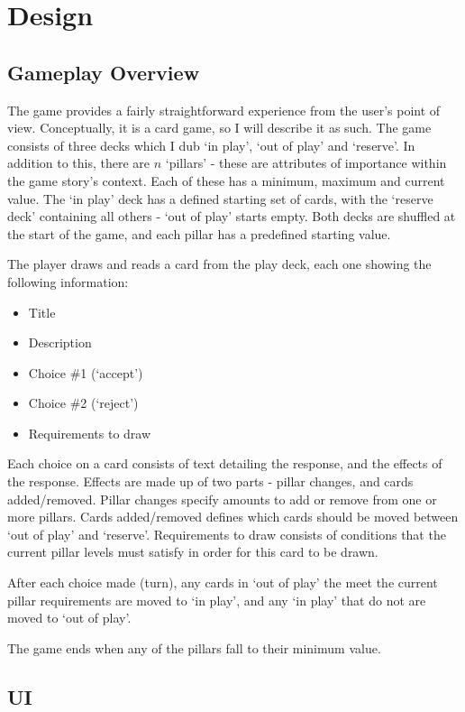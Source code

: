 \chapter{Design}

\section{Gameplay Overview}
The game provides a fairly straightforward experience from the user's point of view.
Conceptually, it is a card game, so I will describe it as such.
The game consists of three decks which I dub `in play', `out of play' and `reserve'. In addition to this, there are $n$ `pillars' - these are attributes of importance within the game story's context. Each of these has a minimum, maximum and current value.
The `in play' deck has a defined starting set of cards, with the `reserve deck' containing all others - `out of play' starts empty.
Both decks are shuffled at the start of the game, and each pillar has a predefined starting value.

The player draws and reads a card from the play deck, each one showing the following information:

\begin{itemize}
    \item Title
    \item Description
    \item Choice \#1 (`accept')
    \item Choice \#2 (`reject')
    \item Requirements to draw
\end{itemize}
Each choice on a card consists of text detailing the response, and the effects of the response. Effects are made up of two parts - pillar changes, and cards added/removed. Pillar changes specify amounts to add or remove from one or more pillars. Cards added/removed defines which cards should be moved between `out of play' and `reserve'.
Requirements to draw consists of conditions that the current pillar levels must satisfy in order for this card to be drawn.

After each choice made (turn), any cards in `out of play' the meet the current pillar requirements are moved to `in play', and any `in play' that do not are moved to `out of play'. 

The game ends when any of the pillars fall to their minimum value.

\section{UI}

